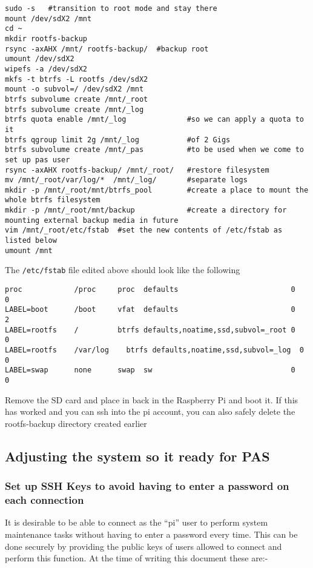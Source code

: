 \documentclass[Draft]{akc}
\begin{document}
\begin{lstlisting}
sudo -s   #transition to root mode and stay there
mount /dev/sdX2 /mnt
cd ~
mkdir rootfs-backup
rsync -axAHX /mnt/ rootfs-backup/  #backup root
umount /dev/sdX2
wipefs -a /dev/sdX2
mkfs -t btrfs -L rootfs /dev/sdX2
mount -o subvol=/ /dev/sdX2 /mnt
btrfs subvolume create /mnt/_root
btrfs subvolume create /mnt/_log
btrfs quota enable /mnt/_log              #so we can apply a quota to it
btrfs qgroup limit 2g /mnt/_log           #of 2 Gigs
btrfs subvolume create /mnt/_pas          #to be used when we come to set up pas user
rsync -axAHX rootfs-backup/ /mnt/_root/   #restore filesystem
mv /mnt/_root/var/log/*  /mnt/_log/       #separate logs
mkdir -p /mnt/_root/mnt/btrfs_pool        #create a place to mount the whole btrfs filesystem
mkdir -p /mnt/_root/mnt/backup            #create a directory for mounting external backup media in future
vim /mnt/_root/etc/fstab  #set the new contents of /etc/fstab as listed below
umount /mnt
\end{lstlisting}

The \texttt{/etc/fstab} file edited above should look like the following

\begin{lstlisting}
proc            /proc     proc  defaults                          0    0
LABEL=boot      /boot     vfat  defaults                          0    2
LABEL=rootfs    /         btrfs defaults,noatime,ssd,subvol=_root 0    0
LABEL=rootfs    /var/log	btrfs defaults,noatime,ssd,subvol=_log  0    0
LABEL=swap      none      swap  sw                                0    0
\end{lstlisting}

Remove the SD card and place in back in the Raspberry Pi and boot it.  If this has worked and you can ssh into the pi
account, you can also safely delete the rootfs-backup directory created earlier


\subsection{Adjusting the system so it ready for PAS}

\subsubsection{Set up SSH Keys to avoid having to enter a password on each connection}

It is desirable to be able to connect as the ``pi'' user to perform system maintenance tasks without having
to enter a password every time.  This can be done securely by providing the public keys of users
allowed to connect and perform this function. At the time of writing this document these are:-
\end{document}

